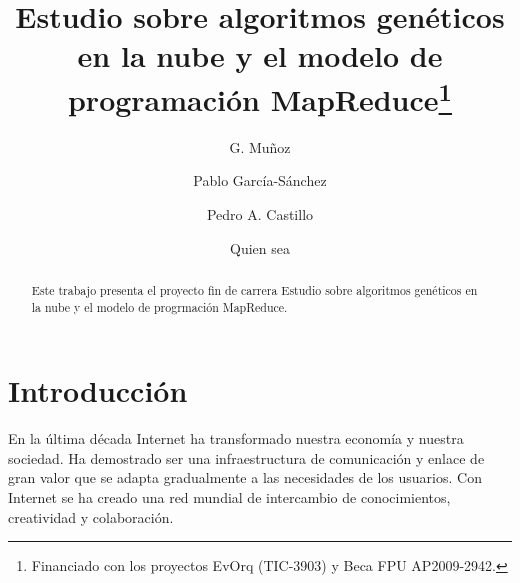 \documentclass[runningheads]{llncs}
\begin{document}
 \pagestyle{empty} %
\mainmatter  %

\title{Estudio sobre algoritmos genéticos en la nube y el modelo de programación MapReduce\thanks{Financiado con los proyectos EvOrq (TIC-3903) y Beca FPU AP2009-2942. }}


%
%
\author{G. Mu\~noz  \and Pablo Garc\'ia-S\'anchez  \and Pedro A. Castillo  \and Quien sea }
%



%
%

\maketitle


\begin{abstract}
Este trabajo presenta el proyecto fin de carrera Estudio sobre algoritmos genéticos en la nube y el modelo de progrmación MapReduce.

\end{abstract}


\section{Introducción}
\noindent En la última década Internet ha transformado nuestra economía y nuestra sociedad. Ha demostrado ser una infraestructura de comunicación 
y enlace de gran valor que se adapta gradualmente a las necesidades de los usuarios. Con Internet se ha creado una red mundial de 
intercambio de conocimientos, creatividad y colaboración. 
\end{document}
